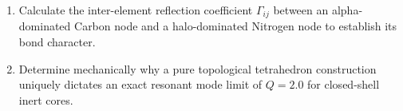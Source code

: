 \begin{exercisebox}
\begin{enumerate}
    \item Calculate the inter-element reflection coefficient $\Gamma_{ij}$ between an alpha-dominated Carbon node and a halo-dominated Nitrogen node to establish its bond character.
    \item Determine mechanically why a pure topological tetrahedron construction uniquely dictates an exact resonant mode limit of $Q = 2.0$ for closed-shell inert cores.
\end{enumerate}
\end{exercisebox}